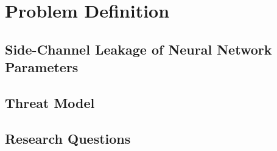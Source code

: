 \chapter{Problem Definition}
\label{chap:problem}

\section{Side-Channel Leakage of Neural Network Parameters}

\section{Threat Model}

\section{Research Questions}
